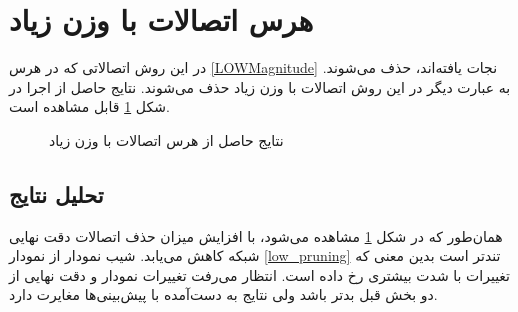 \section{هرس اتصالات با وزن زیاد}\label{high_mag_pruning}

در این روش اتصالاتی که در هرس 
\ref{LOWMagnitude}
نجات یافته‌اند، حذف می‌شوند. به عبارت دیگر در این روش اتصالات با وزن زیاد حذف می‌شوند. نتایج حاصل از اجرا در شکل
\ref{high-mag}
قابل مشاهده است.

\begin{figure}[H]
	\caption{نتایج حاصل از هرس اتصالات با وزن زیاد}
	\label{high-mag}
\end{figure}
\subsection{تحلیل نتایج}
همان‌طور که در شکل
\ref{high-mag}
مشاهده می‌شود، با افزایش میزان حذف اتصالات دقت نهایی شبکه کاهش می‌یابد. شیب نمودار از نمودار
\ref{low_pruning}
تندتر است بدین معنی که تغییرات با شدت بیشتری رخ داده است. انتظار می‌رفت تغییرات نمودار و دقت نهایی از دو بخش قبل بدتر باشد ولی نتایج به دست‌آمده با پیش‌بینی‌ها مغایرت دارد.

\newpage
